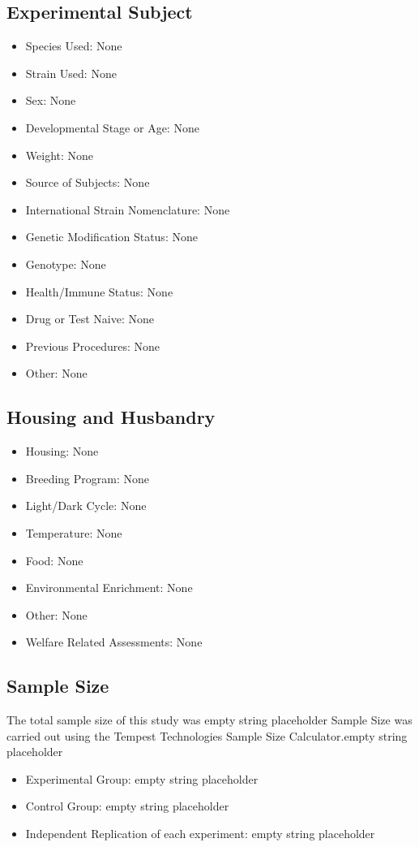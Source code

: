 \documentclass{article}%
\begin{document}
%
\subsection{Experimental Subject}%
\label{subsec:Experimental Subject}%
\begin{itemize}%
\item%
Species Used: None%
\item%
Strain Used: None%
\item%
Sex: None%
\item%
Developmental Stage or Age: None%
\item%
Weight: None%
\item%
Source of Subjects: None%
\item%
International Strain Nomenclature: None%
\item%
Genetic Modification Status: None%
\item%
Genotype: None%
\item%
Health/Immune Status: None%
\item%
Drug or Test Naive: None%
\item%
Previous Procedures: None%
\item%
Other: None%
\end{itemize}

%
\subsection{Housing and Husbandry}%
\label{subsec:Housing and Husbandry}%
\begin{itemize}%
\item%
Housing: None%
\item%
Breeding Program: None%
\item%
Light/Dark Cycle: None%
\item%
Temperature: None%
\item%
Food: None%
\item%
Environmental Enrichment: None%
\item%
Other: None%
\item%
Welfare Related Assessments: None%
\end{itemize}

%
\subsection{Sample Size}%
\label{subsec:Sample Size}%
The total sample size of this study was empty string placeholder%
Sample Size was carried out using the Tempest Technologies Sample Size Calculator.empty string placeholder%
\begin{itemize}%
\item%
Experimental Group: empty string placeholder%
\item%
Control Group: empty string placeholder%
\item%
Independent Replication of each experiment: empty string placeholder%
\end{itemize}
\end{document}
